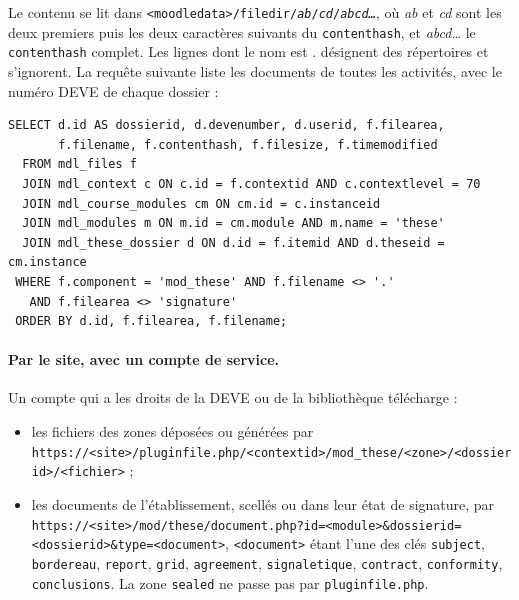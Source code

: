 \documentclass[11pt,a4paper]{article}
\begin{document}
Le contenu se lit dans
\texttt{<moodledata>/filedir/\textit{ab}/\textit{cd}/\textit{abcd\ldots}}, où
\textit{ab} et \textit{cd} sont les deux premiers puis les deux caractères
suivants du \texttt{contenthash}, et \textit{abcd\ldots} le \texttt{contenthash}
complet. Les lignes dont le nom est \og .\fg{} désignent des répertoires et
s'ignorent. La requête suivante liste les documents de toutes les activités,
avec le numéro DEVE de chaque dossier :

\begin{verbatim}
SELECT d.id AS dossierid, d.devenumber, d.userid, f.filearea,
       f.filename, f.contenthash, f.filesize, f.timemodified
  FROM mdl_files f
  JOIN mdl_context c ON c.id = f.contextid AND c.contextlevel = 70
  JOIN mdl_course_modules cm ON cm.id = c.instanceid
  JOIN mdl_modules m ON m.id = cm.module AND m.name = 'these'
  JOIN mdl_these_dossier d ON d.id = f.itemid AND d.theseid = cm.instance
 WHERE f.component = 'mod_these' AND f.filename <> '.'
   AND f.filearea <> 'signature'
 ORDER BY d.id, f.filearea, f.filename;
\end{verbatim}

\paragraph{Par le site, avec un compte de service.} Un compte qui a les droits
de la DEVE ou de la bibliothèque télécharge :
\begin{itemize}
  \item les fichiers des zones déposées ou générées par
        \nolinkurl{https://<site>/pluginfile.php/<contextid>/mod_these/<zone>/<dossierid>/<fichier>} ;
  \item les documents de l'établissement, scellés ou dans leur état de
        signature, par
        \nolinkurl{https://<site>/mod/these/document.php?id=<module>&dossierid=<dossierid>&type=<document>},
        \texttt{<document>} étant l'une des clés \texttt{subject},
        \texttt{bordereau}, \texttt{report}, \texttt{grid}, \texttt{agreement},
        \texttt{signaletique}, \texttt{contract}, \texttt{conformity},
        \texttt{conclusions}. La zone \texttt{sealed} ne passe pas par
        \texttt{pluginfile.php}.
\end{itemize}
\end{document}
